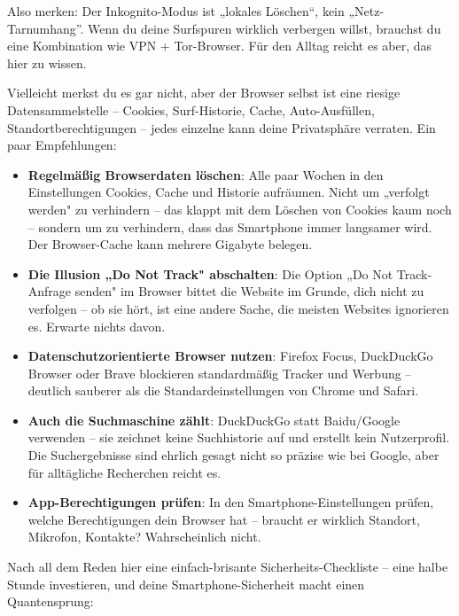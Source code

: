 Also merken: Der Inkognito-Modus ist „lokales Löschen“, kein „Netz-Tarnumhang”. Wenn du deine Surfspuren wirklich verbergen willst, brauchst du eine Kombination wie VPN + Tor-Browser. Für den Alltag reicht es aber, das hier zu wissen.


Vielleicht merkst du es gar nicht, aber der Browser selbst ist eine riesige Datensammelstelle – Cookies, Surf-Historie, Cache, Auto-Ausfüllen, Standortberechtigungen – jedes einzelne kann deine Privatsphäre verraten. Ein paar Empfehlungen:

\begin{itemize}
  \item \textbf{Regelmäßig Browserdaten löschen}: Alle paar Wochen in den Einstellungen Cookies, Cache und Historie aufräumen. Nicht um „verfolgt werden" zu verhindern – das klappt mit dem Löschen von Cookies kaum noch – sondern um zu verhindern, dass das Smartphone immer langsamer wird. Der Browser-Cache kann mehrere Gigabyte belegen.
  \item \textbf{Die Illusion „Do Not Track" abschalten}: Die Option „Do Not Track-Anfrage senden" im Browser bittet die Website im Grunde, dich nicht zu verfolgen – ob sie hört, ist eine andere Sache, die meisten Websites ignorieren es. Erwarte nichts davon.
  \item \textbf{Datenschutzorientierte Browser nutzen}: Firefox Focus, DuckDuckGo Browser oder Brave blockieren standardmäßig Tracker und Werbung – deutlich sauberer als die Standardeinstellungen von Chrome und Safari.
  \item \textbf{Auch die Suchmaschine zählt}: DuckDuckGo statt Baidu/Google verwenden – sie zeichnet keine Suchhistorie auf und erstellt kein Nutzerprofil. Die Suchergebnisse sind ehrlich gesagt nicht so präzise wie bei Google, aber für alltägliche Recherchen reicht es.
  \item \textbf{App-Berechtigungen prüfen}: In den Smartphone-Einstellungen prüfen, welche Berechtigungen dein Browser hat – braucht er wirklich Standort, Mikrofon, Kontakte? Wahrscheinlich nicht.
\end{itemize}


Nach all dem Reden hier eine einfach-brisante Sicherheits-Checkliste – eine halbe Stunde investieren, und deine Smartphone-Sicherheit macht einen Quantensprung:

